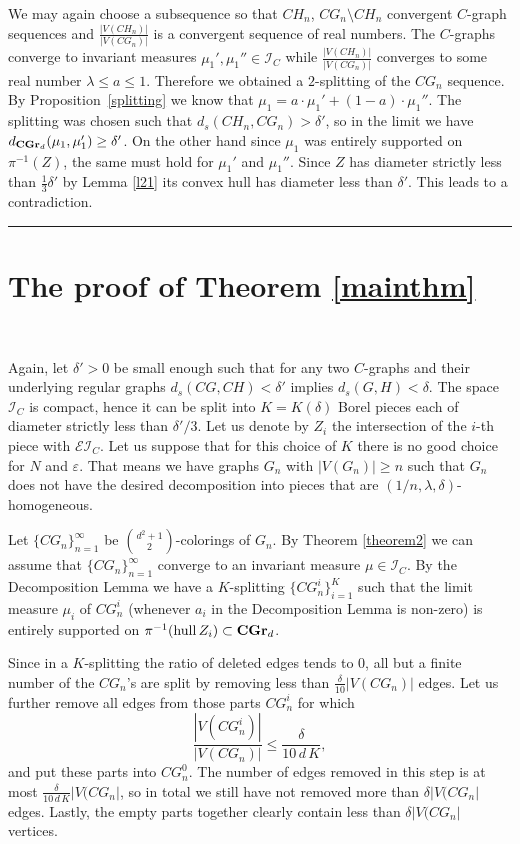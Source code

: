 \documentclass{article}
\newcommand{\ep}{\varepsilon}
\newcommand{\ad}{d^2+1 \choose 2}
\newcommand{\CGrd}[1][d]{\textrm{\textbf{CGr}}_{#1}}
\newcommand{\I}{\mathcal{I}}
\newcommand{\EI}{\mathcal{EI}}
\newcommand{\qed} {\hspace {0.1in} \rule {1.5mm} {3.5mm}}
\begin{document}
We may again choose a subsequence so that $CH_n$, $CG_n
\setminus CH_n$ convergent $C$-graph sequences and 
$\frac{|V(CH_n)|}{|V(CG_n)|}$ is
a convergent sequence of real numbers. The $C$-graphs converge
to invariant measures $\mu_1',\mu_1'' \in \I_C$ while
$\frac{|V(CH_n)|}{|V(CG_n)|}$ converges to some real number $\lambda\leq a \leq
1$. Therefore
we obtained a $2$-splitting of the $CG_n$ sequence. By
Proposition~\ref{splitting} we know that $\mu_1 = a \cdot \mu_1' +
(1-a)\cdot \mu_1''$. The splitting was chosen such that
$d_s(CH_n,CG_n) > \delta'$, so in the limit we have
$d_{\CGrd}(\mu_1,\mu_1') \geq \delta'$. On the other hand since $\mu_1$ was
entirely supported on $\pi^{-1}(Z)$, the same must hold for
$\mu_1'$ and $\mu_1''$.
Since $Z$ has diameter strictly less
than $\frac{1}{3}\delta'$ by Lemma \ref{l21} its convex hull has diameter
less than $\delta'$. This leads to a contradiction. \qed





\section{The proof of Theorem \ref{mainthm}}~\label{mainsec}

Again, let  $\delta' > 0$ be small enough such that for any two $C$-graphs and
their underlying regular graphs $d_s(CG,CH) < \delta'$ implies
$d_s(G,H) < \delta$.
The space $\I_C$ is compact, hence it can be split into $K = K(\delta)$
Borel pieces each of diameter strictly less than $\delta'/3$. Let us
denote by $Z_i$ the intersection of the $i$-th piece with $\EI_C$.  Let
us suppose that for this choice of $K$ there is no good choice for $N$
and $\ep$. That means we have graphs $G_n$ with $|V(G_n)| \geq n$ such
that $G_n$ does not have the desired decomposition into pieces that
are $(1/n, \lambda, \delta)$-homogeneous.

 Let $\{CG_n\}^\infty_{n=1}$ be $\ad$-colorings of $G_n$. By Theorem
 \ref{theorem2} we can assume
that $\{CG_n\}^\infty_{n=1}$
converge to an invariant measure $\mu\in\I_C$. By the Decomposition
Lemma we have a $K$-splitting $\{CG^i_n\}^K_{i=1}$ such that
the limit measure $\mu_i$ of $CG^i_n$ (whenever $a_i$ in the Decomposition
Lemma is non-zero) is entirely supported 
on $\pi^{-1}(\mbox{hull}\,Z_i)\subset \CGrd$.


Since in a $K$-splitting the ratio of deleted edges tends to 0, all
but a finite number of the $CG_n$'s are split by removing less
than $\frac{\delta}{10} |V(CG_n)|$ edges. Let us further remove all edges
from those parts $CG_n^i$ for which
\[\frac{|V(CG_n^i)|} {|V(CG_n)|}\leq \frac{\delta}{10\,d\,K},\]
and put these parts into $CG_n^0$. The number of edges removed in this
step is at most $\frac{\delta}{10\,d\,K} |V(CG_n|$, so in total we still
have not removed more than $\delta |V(CG_n|$ edges. Lastly, the
empty parts together clearly contain less than $\delta |V(CG_n|$
vertices.
\end{document}
